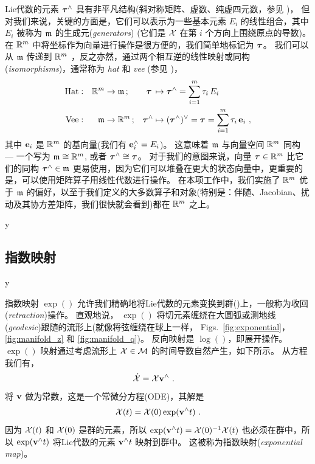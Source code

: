%
Lie代数的元素 ${\bm \tau}^\wedge$ 具有非平凡结构(斜对称矩阵、虚数、纯虚四元数，参见 )，
但对我们来说，关键的方面是，它们可以表示为一些基本元素 $E_i$ 的线性组合，其中 $E_i$ 被称为 $\frak{m}$ 的生成元(\emph{generators}) 
(它们是 $\mathcal{X}$ 在第 $i$ 个方向上围绕原点的导数)。
在 ${\mathbb R}^m$ 中将坐标作为向量进行操作是很方便的，我们简单地标记为 ${\bm \tau}$。
我们可以从 $\frak{m}$ 传递到 ${\mathbb R}^m$ ，反之亦然，通过两个相互逆的线性映射或同构(\emph{isomorphisms})，通常称为 \emph{hat} 和 \emph{vee} (参见 )，
%
\begin{align} 
\textrm{Hat}&:& 
{\mathbb R}^m&\to\frak{m}\,; 
 & 
 {\bm \tau}\,
 &\mapsto {\bm \tau}^\wedge 
 = \sum_{i=1}^m \tau_i\, E_i \label{equ:hat} 
\\
\textrm{Vee}&:& 
 \frak{m}&\to{\mathbb R}^m\,; 
 & {\bm \tau}^\wedge
 & \mapsto ({\bm \tau}^\wedge)^\vee
 ={\bm \tau}
 = \sum_{i=1}^m \tau_i\,{\bf e}_i  \label{equ:vee}
~,
\end{align}
%
其中 ${\bf e}_i$ 是 ${\mathbb R}^m$ 的基向量(我们有 ${\bf e}_i^\wedge=E_i$)。
这意味着 $\frak{m}$ 与向量空间 ${\mathbb R}^m$ 同构 
--- 一个写为 $\frak{m}\cong{\mathbb R}^m$, 或者 ${\bm \tau}^\wedge\cong{\bm \tau}$。
对于我们的意图来说，向量 ${\bm \tau}\in{\mathbb R}^m$ 比它们的同构 ${\bm \tau}^\wedge\in\frak{m}$ 更易使用，因为它们可以堆叠在更大的状态向量中，更重要的是，可以使用矩阵算子用线性代数进行操作。
在本项工作中，我们实施了 ${\mathbb R}^m$ 优于 $\frak{m}$ 的偏好，以至于我们定义的大多数算子和对象(特别是：伴随、Jacobian、扰动及其协方差矩阵，我们很快就会看到)都在 ${\mathbb R}^m$ 之上。



\if\examples y

\fi



\subsection{指数映射}


\if\examples y

\fi

指数映射 $\exp()$ 允许我们精确地将Lie代数的元素变换到群()上，一般称为收回(\emph{retraction})操作。
直观地说， $\exp()$ 将切元素缠绕在大圆弧或测地线(\emph{geodesic})跟随的流形上(就像将弦缠绕在球上一样， Figs.~\ref{fig:exponential}， \ref{fig:manifold_z} 和 \ref{fig:manifold_q})。
反向映射是 $\log()$，即展开操作。
 $\exp()$ 映射通过考虑流形上 $\mathcal{X}\in\mathcal{M}$ 的时间导数自然产生，如下所示。
%
从方程  我们有，
%
\begin{align}\label{equ:ode}
\dot{\mathcal{X}} &= \mathcal{X}{\bf v}^\wedge 
~.
\end{align}
%
将 ${\bf v}$ 做为常数，这是一个常微分方程(ODE)，其解是 
%
\begin{align}\label{equ:exp_at_X}
\mathcal{X}(t)  = \mathcal{X}(0)\exp({\bf v}^\wedge t)
~.
\end{align}
%
因为 $\mathcal{X}(t)$ 和 $\mathcal{X}(0)$ 是群的元素，所以 $\exp({\bf v}^\wedge t)=\mathcal{X}(0)^{-1}\mathcal{X}(t)$ 也必须在群中，所以 $\exp({\bf v}^\wedge t)$ 将Lie代数的元素 ${\bf v}^\wedge t$ 映射到群中。
这被称为指数映射(\emph{exponential map})。

